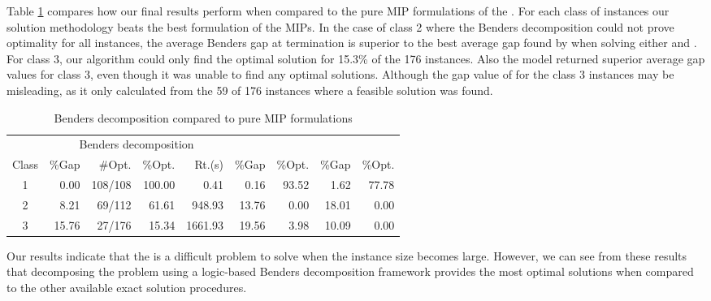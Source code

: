 Table \ref{tab:exp:resultsBenchmark} compares how our final results perform
when compared to the pure MIP formulations of the .
For each class of instances our solution methodology beats the best formulation
of the MIPs.
In the case of class 2 where the Benders decomposition could not prove optimality for
all instances, the average Benders gap at termination is superior to
the best average gap found by \gurobi when solving either  and .
For class 3, our algorithm could only find the optimal solution for 15.3\% of the 176 instances.
Also the  model returned superior average gap values for class 3, even though
it was unable to find any optimal solutions.
Although the gap value of  for the class 3 instances
may be misleading, as it only calculated from
the 59 of 176 instances where a feasible solution was found.

\begin{table}[tpb]
	\caption{Benders decomposition compared to pure MIP formulations}
	\centering
	\vspace{2mm}
	\begin{tabular}{crrrrrrrr}
		\toprule
		 & \multicolumn{4}{c}{Benders decomposition}  & \multicolumn{2}{c}{\fsbf{2}} & \multicolumn{2}{c}{\scbf{2}}  \\
		 \cmidrule(lr){2-5} \cmidrule(lr){6-7} \cmidrule(lr){8-9}
		Class & \%Gap & \#Opt. & \%Opt. & Rt.(s) & \%Gap & \%Opt. & \%Gap & \%Opt. \\\midrule\midrule
		1 & 0.00 & 108/108 & 100.00 & 0.41 & 0.16 & 93.52 & 1.62 & 77.78 \\
		2 & 8.21 & 69/112 & 61.61 & 948.93 & 13.76 & 0.00 & 18.01 & 0.00 \\
		3 & 15.76 & 27/176 & 15.34 & 1661.93 & 19.56 & 3.98 & 10.09 & 0.00 \\
		\bottomrule
	\end{tabular}
	\label{tab:exp:resultsBenchmark}
\end{table}

Our results indicate that the  is a difficult problem to solve
when the instance size becomes large.
However, we can see from these results that decomposing the problem using a 
logic-based Benders decomposition framework provides
the most optimal solutions when compared to the other available exact
solution procedures.


